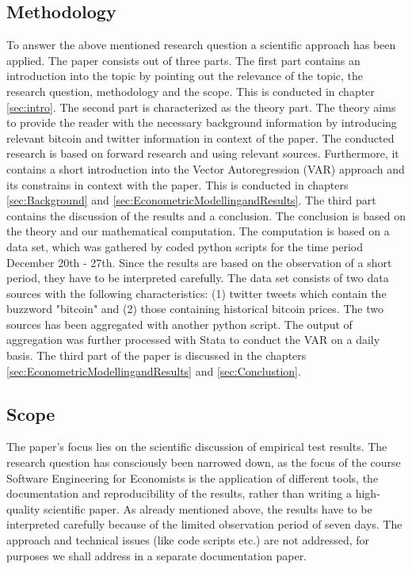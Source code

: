 \documentclass[a4paper,american,12pt]{article}
\begin{document}
\begin{spacing}{1.2}
\subsection{Methodology}
\label{sec:Methodology}
To answer the above mentioned research question a scientific approach has been applied. The paper consists out of three parts. The first part contains an introduction into the topic by pointing out the relevance of the topic, the research question, methodology and the scope. This is conducted in chapter \ref{sec:intro}. The second part is characterized as the theory part. The theory aims to provide the reader with the necessary background information by introducing relevant bitcoin and twitter information in context of the paper. The conducted research is based on forward research and using relevant sources. Furthermore, it contains a short introduction into the Vector Autoregression (VAR) approach and its constrains in context with the paper. This is conducted in chapters \ref{sec:Background} and \ref{sec:EconometricModellingandResults}. The third part contains the discussion of the results and a conclusion. The conclusion is based on the theory and our mathematical computation. The computation is based on a data set, which was gathered by coded python scripts for the time period December 20th - 27th. Since the results are based on the observation of a short period, they have to be interpreted carefully. The data set consists of two data sources with the following characteristics: (1) twitter tweets which contain the buzzword "bitcoin" and (2) those containing historical bitcoin prices. The two sources has been aggregated with another python script. The output of aggregation was further processed with Stata to conduct the VAR on a daily basis. The third part of the paper is discussed in the chapters \ref{sec:EconometricModellingandResults} and \ref{sec:Conclustion}.

\subsection{Scope}
\label{sec:Scope}
The paper's focus lies on the scientific discussion of empirical test results. The research question has consciously been narrowed down, as the focus of the course Software Engineering for Economists is the application of different tools, the documentation and reproducibility of the results, rather than writing a high-quality scientific paper. As already mentioned above, the results have to be interpreted carefully because of the limited observation period of seven days. The approach and technical issues (like code scripts etc.) are not addressed, for purposes we shall address in a separate documentation paper.


\end{spacing}
\end{document}
